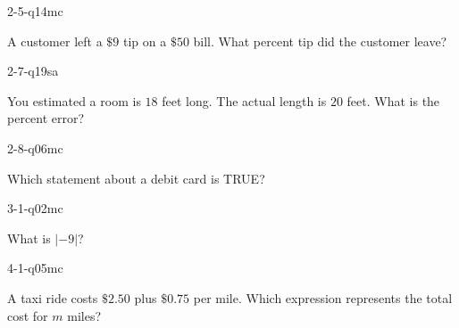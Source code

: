 \begin{practiceQuestion}{2-5-q14}{mc}
\begin{questionText}
A customer left a $\$9$ tip on a $\$50$ bill. What percent tip did the customer leave?


\end{questionText}
\end{practiceQuestion}

\begin{practiceQuestion}{2-7-q19}{sa}
\begin{questionText}
You estimated a room is $18$ feet long. The actual length is $20$ feet. What is the percent error?
\end{questionText}
\end{practiceQuestion}

\begin{practiceQuestion}{2-8-q06}{mc}
\begin{questionText}
Which statement about a debit card is TRUE?
\end{questionText}
\end{practiceQuestion}

\begin{practiceQuestion}{3-1-q02}{mc}
\begin{questionText}
What is $|-9|$?
\end{questionText}
\end{practiceQuestion}

\begin{practiceQuestion}{4-1-q05}{mc}
\begin{questionText}
A taxi ride costs $\$2.50$ plus $\$0.75$ per mile. Which expression represents the total cost for $m$ miles?
\end{questionText}
\end{practiceQuestion}

